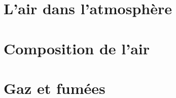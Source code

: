 \documentclass[xcolor={dvipsnames}]{beamer}
\title{}
\author{O. FINOT}\institute{Collège S$^t$ Bernard}
\begin{document}
\begin{frame}
  \titlepage 
\end{frame}

\section{L'air dans l'atmosphère}



\begin{frame}
	
\end{frame}


\begin{frame}
	
\end{frame}



\section{Composition de l'air}

\begin{frame}
	
\end{frame}


\begin{frame}
	
\end{frame}

\section{Gaz et fumées}

\begin{frame}
	
\end{frame}


\begin{frame}
	
\end{frame}

%
%	
%
%
%	
\end{document}
